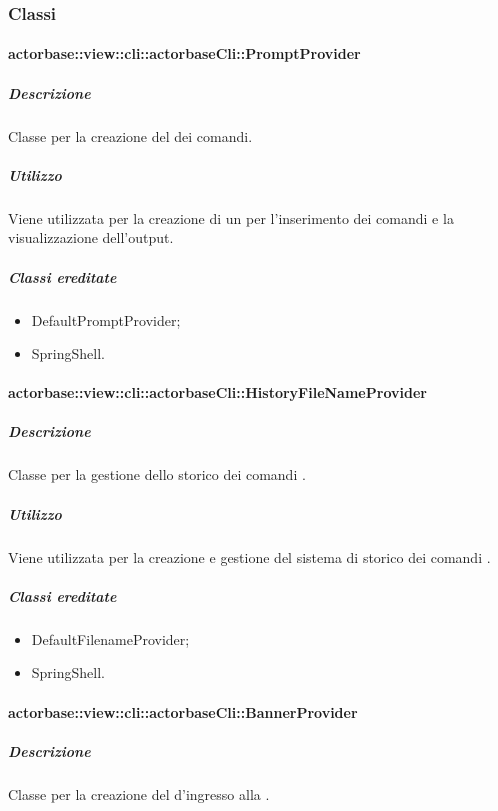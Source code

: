 \documentclass{scalatekids-article}
\begin{document}
\subsubsection{Classi}

\paragraph{actorbase::view::cli::actorbaseCli::PromptProvider}

\subparagraph{Descrizione}

Classe per la creazione del  dei comandi.

\subparagraph{Utilizzo}

Viene utilizzata per la creazione di un  per l'inserimento dei comandi e la visualizzazione dell'output.

\subparagraph{Classi ereditate}

\begin{itemize}
\item DefaultPromptProvider;
\item SpringShell.
\end{itemize}

\paragraph{actorbase::view::cli::actorbaseCli::HistoryFileNameProvider}

\subparagraph{Descrizione}

Classe per la gestione dello storico dei comandi .

\subparagraph{Utilizzo}

Viene utilizzata per la creazione e gestione del sistema di storico dei comandi .

\subparagraph{Classi ereditate}

\begin{itemize}
\item DefaultFilenameProvider;
\item SpringShell.
\end{itemize}

\paragraph{actorbase::view::cli::actorbaseCli::BannerProvider}

\subparagraph{Descrizione}

Classe per la creazione del  d'ingresso alla .
\end{document}
